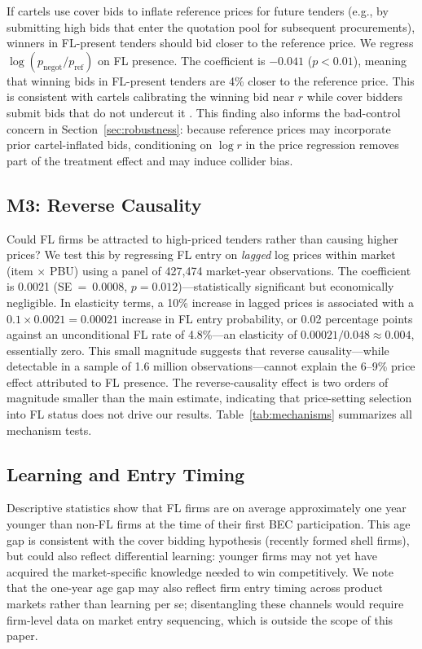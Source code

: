 If cartels use cover bids to inflate reference prices for future
tenders (e.g., by submitting high bids that enter the quotation pool
for subsequent procurements), winners in FL-present tenders should bid
closer to the reference price. We regress
$\log(p_{\text{negot}} / p_{\text{ref}})$ on FL presence. The
coefficient is $-0.041$ ($p < 0.01$), meaning that winning bids in
FL-present tenders are 4\% closer to the reference price. This is
consistent with cartels calibrating the winning bid near $r$ while
cover bidders submit bids that do not undercut it
\citep{marshall2012economics}. This finding also informs the
bad-control concern in Section~\ref{sec:robustness}: because reference
prices may incorporate prior cartel-inflated bids, conditioning on
$\log r$ in the price regression removes part of the treatment effect
and may induce collider bias.

\subsection{M3: Reverse Causality}

Could FL firms be attracted to high-priced tenders rather than causing
higher prices? We test this by regressing FL entry on \emph{lagged} log
prices within market (item $\times$ PBU) using a panel of 427,474
market-year observations. The coefficient is 0.0021 (SE~=~0.0008,
$p = 0.012$)---statistically significant but economically negligible.
In elasticity terms, a 10\% increase in lagged prices is associated with
a $0.1 \times 0.0021 = 0.00021$ increase in FL entry probability, or
0.02 percentage points against an unconditional FL rate of 4.8\%---an
elasticity of $0.00021 / 0.048 \approx 0.004$, essentially zero. This
small magnitude suggests that reverse causality---while detectable in a
sample of 1.6 million observations---cannot explain the 6--9\% price
effect attributed to FL presence. The reverse-causality effect is two
orders of magnitude smaller than the main estimate, indicating that
price-setting selection into FL status does not drive our results.
Table~\ref{tab:mechanisms} summarizes all mechanism tests.



\subsection{Learning and Entry Timing}

Descriptive statistics show that FL firms are on average approximately %
one year younger than non-FL firms at the time of their first BEC
participation. This age gap is consistent with the cover bidding
hypothesis (recently formed shell firms), but could also reflect
differential learning: younger firms may not yet have acquired the
market-specific knowledge needed to win competitively. We note that the
one-year age gap may also reflect firm entry timing across product markets
rather than learning per se; disentangling these channels would require
firm-level data on market entry sequencing, which is outside the scope of
this paper.

